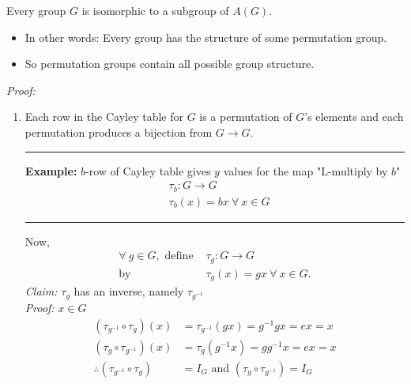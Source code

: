 \begin{theorem} 
Every group $G$ is isomorphic to a subgroup of $A(G)$.
\begin{itemize}
    \item In other words: Every group has the structure of some permutation group.
    \item So permutation groups contain all possible group structure.
\end{itemize}
\textit{Proof:} 
\begin{enumerate}
   \item Each row in the Cayley table for $G$ is a permutation of $G$'s elements and each permutation produces a bijection from $G\rightarrow G$.\\%
\hrule
\textbf{Example:} $b$-row of Cayley table gives $y$ values for the map "L-multiply by $b$"
\begin{align}
    &\tau_b : G\rightarrow G \nonumber \\
    &\tau_b(x)=bx \ \forall \ x \in G \nonumber 
\end{align}
\hrule
Now,
\begin{align}
    \forall \ g\in G, \text{ define } &\tau_g: G\rightarrow G \nonumber \\
    \text{by }&\tau_g(x)=gx \ \forall \ x \in G. \nonumber
\end{align}
\textit{Claim:} $\tau_g$ has an inverse, namely $\tau_{g^{-1}}$\\
\textit{Proof:} $x\in G$
\begin{align}
    (\tau_{g^{-1}} \circ \tau_g)(x)&=\tau_{g^{-1}}(gx)=g^{-1}gx=ex=x \nonumber \\
    (\tau_g \circ \tau_{g^{-1}})(x)&=\tau_{g}(g^{-1}x)=gg^{-1}x=ex=x \nonumber \\
    \therefore (\tau_{g^{-1}} \circ \tau_g) &= I_G \text{ and } (\tau_g \circ \tau_{g^{-1}})= I_G \nonumber \\

\end{align}
\end{enumerate}
\end{theorem}
